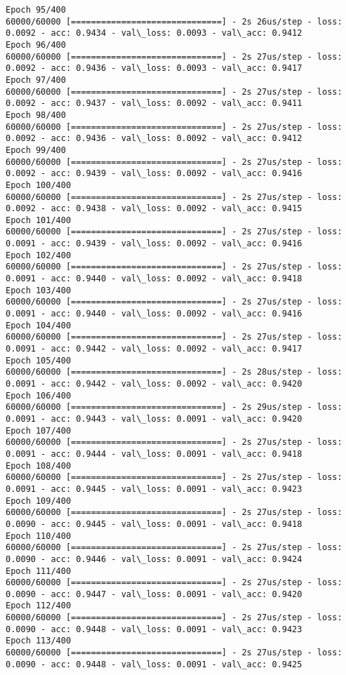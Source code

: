 \documentclass[11pt]{article}
\begin{document}
\begin{Verbatim}[commandchars=\\\{\}]
Epoch 95/400
60000/60000 [==============================] - 2s 26us/step - loss: 0.0092 - acc: 0.9434 - val\_loss: 0.0093 - val\_acc: 0.9412
Epoch 96/400
60000/60000 [==============================] - 2s 27us/step - loss: 0.0092 - acc: 0.9436 - val\_loss: 0.0093 - val\_acc: 0.9417
Epoch 97/400
60000/60000 [==============================] - 2s 27us/step - loss: 0.0092 - acc: 0.9437 - val\_loss: 0.0092 - val\_acc: 0.9411
Epoch 98/400
60000/60000 [==============================] - 2s 27us/step - loss: 0.0092 - acc: 0.9436 - val\_loss: 0.0092 - val\_acc: 0.9412
Epoch 99/400
60000/60000 [==============================] - 2s 27us/step - loss: 0.0092 - acc: 0.9439 - val\_loss: 0.0092 - val\_acc: 0.9416
Epoch 100/400
60000/60000 [==============================] - 2s 27us/step - loss: 0.0092 - acc: 0.9438 - val\_loss: 0.0092 - val\_acc: 0.9415
Epoch 101/400
60000/60000 [==============================] - 2s 27us/step - loss: 0.0091 - acc: 0.9439 - val\_loss: 0.0092 - val\_acc: 0.9416
Epoch 102/400
60000/60000 [==============================] - 2s 27us/step - loss: 0.0091 - acc: 0.9440 - val\_loss: 0.0092 - val\_acc: 0.9418
Epoch 103/400
60000/60000 [==============================] - 2s 27us/step - loss: 0.0091 - acc: 0.9440 - val\_loss: 0.0092 - val\_acc: 0.9416
Epoch 104/400
60000/60000 [==============================] - 2s 27us/step - loss: 0.0091 - acc: 0.9442 - val\_loss: 0.0092 - val\_acc: 0.9417
Epoch 105/400
60000/60000 [==============================] - 2s 28us/step - loss: 0.0091 - acc: 0.9442 - val\_loss: 0.0092 - val\_acc: 0.9420
Epoch 106/400
60000/60000 [==============================] - 2s 29us/step - loss: 0.0091 - acc: 0.9443 - val\_loss: 0.0091 - val\_acc: 0.9420
Epoch 107/400
60000/60000 [==============================] - 2s 27us/step - loss: 0.0091 - acc: 0.9444 - val\_loss: 0.0091 - val\_acc: 0.9418
Epoch 108/400
60000/60000 [==============================] - 2s 27us/step - loss: 0.0091 - acc: 0.9445 - val\_loss: 0.0091 - val\_acc: 0.9423
Epoch 109/400
60000/60000 [==============================] - 2s 27us/step - loss: 0.0090 - acc: 0.9445 - val\_loss: 0.0091 - val\_acc: 0.9418
Epoch 110/400
60000/60000 [==============================] - 2s 27us/step - loss: 0.0090 - acc: 0.9446 - val\_loss: 0.0091 - val\_acc: 0.9424
Epoch 111/400
60000/60000 [==============================] - 2s 27us/step - loss: 0.0090 - acc: 0.9447 - val\_loss: 0.0091 - val\_acc: 0.9420
Epoch 112/400
60000/60000 [==============================] - 2s 27us/step - loss: 0.0090 - acc: 0.9448 - val\_loss: 0.0091 - val\_acc: 0.9423
Epoch 113/400
60000/60000 [==============================] - 2s 27us/step - loss: 0.0090 - acc: 0.9448 - val\_loss: 0.0091 - val\_acc: 0.9425

\end{Verbatim}
\end{document}
